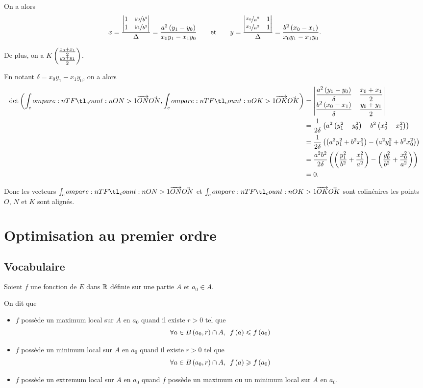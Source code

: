 \begin{corr}
On a alors \[x=\dfrac{\begin{vmatrix}1 & \nicefrac{y_0}{b^2} \\ 1 & \nicefrac{y_1}{b^2}\end{vmatrix}}{\Delta}=\dfrac{a^2\left(y_1-y_0\right)}{x_0y_1-x_1y_0}\qquad\text{et}\qquad y=\dfrac{\begin{vmatrix}\nicefrac{x_0}{a^2} & 1 \\ \nicefrac{x_1}{a^2} & 1\end{vmatrix}}{\Delta}=\dfrac{b^2\left(x_0-x_1\right)}{x_0y_1-x_1y_0}.\]

De plus, on a \(K\begin{pmatrix}\frac{x_0+x_1}{2}\\\frac{y_0+y_1}{2}\end{pmatrix}\).

En notant \(\delta=x_0y_1-x_1y_0\), on a alors \[\begin{aligned}
\det\paren{\v{ON},\v{OK}}&=\begin{vmatrix}
\dfrac{a^2\paren{y_1-y_0}}{\delta} & \dfrac{x_0+x_1}{2} \\
\dfrac{b^2\paren{x_0-x_1}}{\delta} & \dfrac{y_0+y_1}{2}
\end{vmatrix} \\
&=\dfrac{1}{2\delta}\paren{a^2\paren{y_1^2-y_0^2}-b^2\paren{x_0^2-x_1^2}} \\
&=\dfrac{1}{2\delta}\paren{\paren{a^2y_1^2+b^2x_1^2}-\paren{a^2y_0^2+b^2x_0^2}} \\
&=\dfrac{a^2b^2}{2\delta}\paren{\paren{\dfrac{y_1^2}{b^2}+\dfrac{x_1^2}{a^2}}-\paren{\dfrac{y_0^2}{b^2}+\dfrac{x_0^2}{a^2}}} \\
&=0.
\end{aligned}\]

Donc les vecteurs \(\v{ON}\) et \(\v{OK}\) sont colinéaires \ie les points \(O\), \(N\) et \(K\) sont alignés.
\end{corr}

\section{Optimisation au premier ordre}

\subsection{Vocabulaire}

\begin{defi}
Soient \(f\) une fonction de \(E\) dans \(\mathbb{R}\) définie sur une partie \(A\) et \(a_0\in A\).

On dit que

\begin{itemize}
    \item \(f\) possède un maximum local sur \(A\) en \(a_0\) quand il existe \(r>0\) tel que \[\quantifs{\forall a\in\bouleo{a_0}{r}\inter A}f\paren{a}\leq f\paren{a_0}\]
    \item \(f\) possède un minimum local sur \(A\) en \(a_0\) quand il existe \(r>0\) tel que \[\quantifs{\forall a\in\bouleo{a_0}{r}\inter A}f\paren{a}\geq f\paren{a_0}\]
    \item \(f\) possède un extremum local sur \(A\) en \(a_0\) quand \(f\) possède un maximum ou un minimum local sur \(A\) en \(a_0\).
\end{itemize}
\end{defi}

